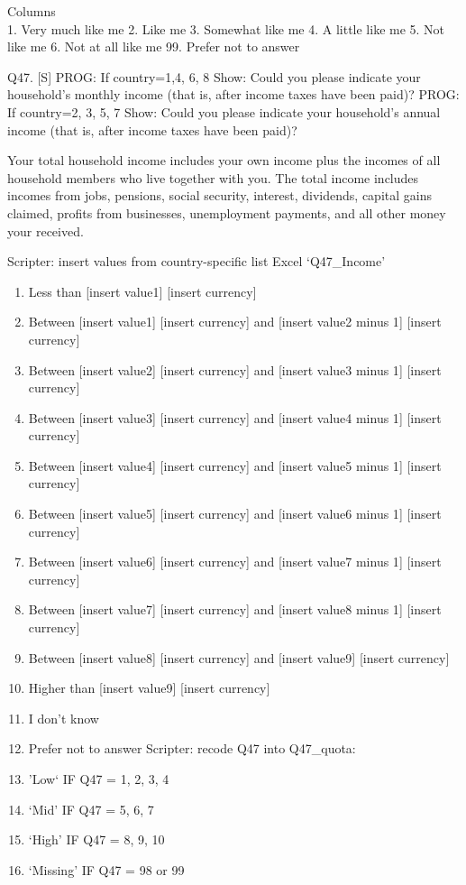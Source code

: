 \documentclass[
  12pt,
  a4paper,
]{article}
\providecommand{\tightlist}{%
  \setlength{\itemsep}{0pt}\setlength{\parskip}{0pt}}
\begin{document}
Columns\\
1. Very much like me
2. Like me
3. Somewhat like me
4. A little like me
5. Not like me
6. Not at all like me
99. Prefer not to answer

Q47. {[}S{]} PROG: If country=1,4, 6, 8 Show: Could you please indicate your household's monthly income (that is, after income taxes have been paid)?
PROG: If country=2, 3, 5, 7 Show: Could you please indicate your household's annual income (that is, after income taxes have been paid)?

Your total household income includes your own income plus the incomes of all household members who live together with you. The total income includes incomes from jobs, pensions, social security, interest, dividends, capital gains claimed, profits from businesses, unemployment payments, and all other money your received.

Scripter: insert values from country-specific list Excel `Q47\_Income'

\begin{enumerate}
\def\labelenumi{\arabic{enumi}.}
\tightlist
\item
  Less than {[}insert value1{]} {[}insert currency{]}
\item
  Between {[}insert value1{]} {[}insert currency{]} and {[}insert value2 minus 1{]} {[}insert currency{]}
\item
  Between {[}insert value2{]} {[}insert currency{]} and {[}insert value3 minus 1{]} {[}insert currency{]}
\item
  Between {[}insert value3{]} {[}insert currency{]} and {[}insert value4 minus 1{]} {[}insert currency{]}
\item
  Between {[}insert value4{]} {[}insert currency{]} and {[}insert value5 minus 1{]} {[}insert currency{]}
\item
  Between {[}insert value5{]} {[}insert currency{]} and {[}insert value6 minus 1{]} {[}insert currency{]}
\item
  Between {[}insert value6{]} {[}insert currency{]} and {[}insert value7 minus 1{]} {[}insert currency{]}
\item
  Between {[}insert value7{]} {[}insert currency{]} and {[}insert value8 minus 1{]} {[}insert currency{]}
\item
  Between {[}insert value8{]} {[}insert currency{]} and {[}insert value9{]} {[}insert currency{]}
\item
  Higher than {[}insert value9{]} {[}insert currency{]}
\item
  I don't know
\item
  Prefer not to answer
  Scripter: recode Q47 into Q47\_quota:\\
\item
  'Low` IF Q47 = 1, 2, 3, 4
\item
  `Mid' IF Q47 = 5, 6, 7
\item
  `High' IF Q47 = 8, 9, 10
\item
  `Missing' IF Q47 = 98 or 99
\end{enumerate}
\end{document}
